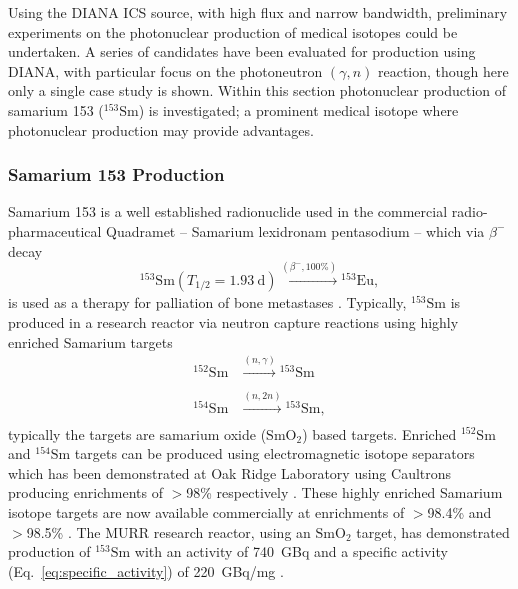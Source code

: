 \documentclass[../main.tex]{subfiles}
\begin{document}
Using the DIANA ICS source, with high flux and narrow bandwidth, preliminary experiments on the photonuclear production of medical isotopes could be undertaken. A series of candidates have been evaluated for production using DIANA, with particular focus on the photoneutron $\left(\gamma,n\right)$ reaction, though here only a single case study is shown. Within this section photonuclear production of samarium 153 ($^{153}\mathrm{Sm}$) is investigated; a prominent medical isotope where photonuclear production may provide advantages.  

\subsubsection{Samarium 153 Production}

Samarium 153 is a well established radionuclide used in the commercial radio-pharmaceutical Quadramet \cite{ema2015quadramet} -- Samarium lexidronam pentasodium -- which via $\beta^{-}$ decay 
\begin{equation}
^{153}\mathrm{Sm} \left(T_{1/2} = 1.93~\mathrm{\si{\day}}\right)\xrightarrow[]{\left(\beta^{-},\mathrm{100\%}\right)} {}^{153}\mathrm{Eu},
\label{eq:153Sm_beta_minus_decay}    
\end{equation}
is used as a therapy for palliation of bone metastases \cite{kapoor2021cancer,murray2021systemic}. Typically, $^{153}\mathrm{Sm}$ is produced in a research reactor via neutron capture reactions using highly enriched Samarium targets 
\begin{align}
^{152}\mathrm{Sm}&\xrightarrow[]{\left(n,\gamma\right)}{}^{153}\mathrm{Sm} \\
^{154}\mathrm{Sm}&\xrightarrow[]{\left(n,2n\right)}{}^{153}\mathrm{Sm},
\label{eq:153Sm_research_reactor_production}
\end{align}
typically the targets are samarium oxide ($\mathrm{SmO}_{2}$) based targets. Enriched $^{152}\mathrm{Sm}$ and $^{154}\mathrm{Sm}$ targets can be produced using electromagnetic isotope separators which has been demonstrated at Oak Ridge Laboratory using Caultrons producing enrichments of $>$98\% respectively \cite{bell1987stable}. These highly enriched Samarium isotope targets are now available commercially at enrichments of $>$98.4\% and $>$98.5\% \cite{isoflex2021sm}. The MURR research reactor, using an $\mathrm{SmO}_{2}$ target, has demonstrated production of $^{153}\mathrm{Sm}$ with an activity of 740~\si{\giga\becquerel} and a specific activity (Eq.~\ref{eq:specific_activity}) of 220~\si{\giga\becquerel}/\si{\milli\gram} \cite{ma1996production}.
\end{document}
